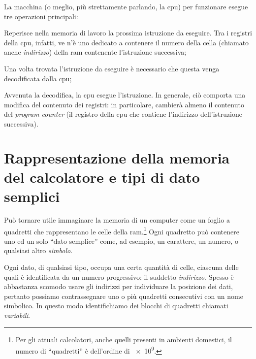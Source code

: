 La  macchina (o meglio, più strettamente parlando, la \ac{cpu}) per funzionare esegue tre operazioni principali:
\begin{description}[]
	\item
[Fetch\index{fetch}] Reperisce nella memoria di lavoro la prossima istruzione da eseguire.
Tra i registri della \ac{cpu}, infatti, ve n'è uno dedicato a contenere il numero della cella (chiamato anche \emph{indirizzo}) della \ac{ram} contenente l'istruzione successiva;
	\item
[Decode\index{decode}] Una volta trovata l'istruzione da eseguire è necessario che questa venga decodificata dalla \ac{cpu};
	\item
[Execute\index{execute}] Avvenuta la decodifica, la \ac{cpu} esegue l'istruzione.
In generale, ciò comporta una modifica del contenuto dei registri: in particolare, cambierà almeno il contenuto del \emph{program counter} (il registro della \ac{cpu} che contiene l'indirizzo dell'istruzione successiva).
\end{description}

	\section{Rappresentazione della memoria del calcolatore e tipi di dato semplici}
	\label{sec:mem}
Può tornare utile immaginare la memoria di un computer come un foglio a quadretti che rappresentano le celle della \ac{ram}.\footnote{Per gli attuali calcolatori, anche quelli presenti in ambienti domestici, il numero di ``quadretti'' è dell'ordine di \num{e9}.}
Ogni quadretto può contenere uno ed un solo ``dato semplice'' come,  ad esempio, un carattere, un numero, o qualsiasi altro \emph{simbolo}.

Ogni dato, di qualsiasi tipo, occupa una certa quantità di celle, ciascuna delle quali è identificata da un numero progressivo: il suddetto \emph{indirizzo}. %
Spesso è abbastanza scomodo usare gli indirizzi per individuare la posizione dei dati, pertanto possiamo contrassegnare uno o più quadretti consecutivi con un nome simbolico.
In questo modo identifichiamo dei blocchi di quadretti  chiamati \emph{variabili}.


